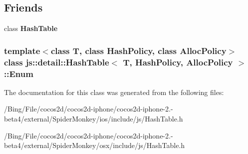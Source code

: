 \subsection*{Friends}
\begin{DoxyCompactItemize}
\item 
\hypertarget{classjs_1_1detail_1_1_hash_table_1_1_enum_a0d65cc1d3f862388016ca21139b4659a}{class {\bfseries Hash\-Table}}\label{classjs_1_1detail_1_1_hash_table_1_1_enum_a0d65cc1d3f862388016ca21139b4659a}

\end{DoxyCompactItemize}
\subsubsection*{template$<$class T, class Hash\-Policy, class Alloc\-Policy$>$ class js\-::detail\-::\-Hash\-Table$<$ T, Hash\-Policy, Alloc\-Policy $>$\-::\-Enum}



The documentation for this class was generated from the following files\-:\begin{DoxyCompactItemize}
\item 
/\-Bing/\-File/cocos2d/cocos2d-\/iphone/cocos2d-\/iphone-\/2.-\/beta4/external/\-Spider\-Monkey/ios/include/js/Hash\-Table.\-h\item 
/\-Bing/\-File/cocos2d/cocos2d-\/iphone/cocos2d-\/iphone-\/2.-\/beta4/external/\-Spider\-Monkey/osx/include/js/Hash\-Table.\-h\end{DoxyCompactItemize}
